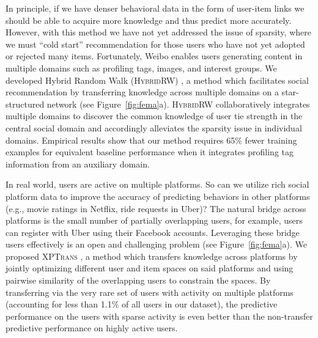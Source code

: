 \documentclass[10.5pt]{article}
\begin{document}
 In principle, if we have denser behavioral data in the form of user-item links we should be able to acquire more knowledge and thus predict more accurately. However, with this method we have not yet addressed the issue of sparsity, where we must ``cold start'' recommendation for those users who have not yet adopted or rejected many items. Fortunately, Weibo enables users generating content in multiple domains such as profiling tags, images, and interest groups. We developed Hybrid Random Walk (\textsc{HybridRW}) \cite{jiang2012socialrecommendation}, a method which facilitates social recommendation by transferring knowledge across multiple domains on a star-structured network (see Figure~\ref{fig:fema}a). \textsc{HybridRW} collaboratively integrates multiple domains to discover the common knowledge of user tie strength in the central social domain and accordingly alleviates the sparsity issue in individual domains. Empirical results show that our method requires 65\% fewer training examples for equivalent baseline performance when it integrates profiling tag information from an auxiliary domain.

 In real world, users are active on multiple platforms. So can we utilize rich social platform data to improve the accuracy of predicting behaviors in other platforms (e.g., movie ratings in Netflix, ride requests in Uber)? The natural bridge across platforms is the small number of partially overlapping users, for example, users can register with Uber using their Facebook accounts. Leveraging these bridge users effectively is an open and challenging problem (see Figure~\ref{fig:fema}a). We proposed \textsc{XPTrans} \cite{jiang2016little}, a method which transfers knowledge across platforms by jointly optimizing different user and item spaces on said platforms and using pairwise similarity of the overlapping users to constrain the spaces. By transferring via the very rare set of users with activity on multiple platforms (accounting for less than 1.1\% of all users in our dataset), the predictive performance on the users with sparse activity is even better than the non-transfer predictive performance on highly active users.
\end{document}
